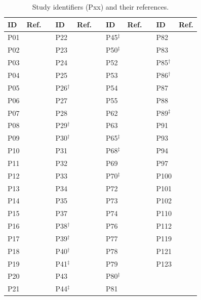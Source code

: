 \documentclass{ieeeaccess}
\begin{document}
\begin{table}[!t]
\caption{Study identifiers (Pxx) and their references.}
\label{tab:pids}
\centering
\footnotesize
\begin{tabular}{@{}llp{6mm}llp{6mm}llp{6mm}ll@{}}
\toprule
\textbf{ID} & \textbf{Ref.} & & \textbf{ID} & \textbf{Ref.} & &
\textbf{ID} & \textbf{Ref.} & & \textbf{ID} & \textbf{Ref.} \\
\midrule
P01 & \cite{P01} & & P22 & \cite{P22} & & P45$^{\ddagger}$ & \cite{P45} & & P82 & \cite{P82} \\
P02 & \cite{P02} & & P23 & \cite{P23} & & P50$^{\ddagger}$ & \cite{P50} & & P83 & \cite{P83} \\
P03 & \cite{P03} & & P24 & \cite{P24} & & P52 & \cite{P52} & & P85$^{\dagger}$ & \cite{P85} \\
P04 & \cite{P04} & & P25 & \cite{P25} & & P53 & \cite{P53} & & P86$^{\dagger}$ & \cite{P86} \\
P05 & \cite{P05} & & P26$^{\dagger}$ & \cite{P26} & & P54 & \cite{P54} & & P87 & \cite{P87} \\
P06 & \cite{P06} & & P27 & \cite{P27} & & P55 & \cite{P55} & & P88 & \cite{P88} \\
P07 & \cite{P07} & & P28 & \cite{P28} & & P62 & \cite{P62} & & P89$^{\ddagger}$ & \cite{P89} \\
P08 & \cite{P08} & & P29$^{\dagger}$ & \cite{P29} & & P63 & \cite{P63} & & P91 & \cite{P91} \\
P09 & \cite{P09} & & P30$^{\dagger}$ & \cite{P30} & & P65$^{\ddagger}$ & \cite{P65} & & P93 & \cite{P93} \\
P10 & \cite{P10} & & P31 & \cite{P31} & & P68$^{\ddagger}$ & \cite{P68} & & P94 & \cite{P94} \\
P11 & \cite{P11} & & P32 & \cite{P32} & & P69 & \cite{P69} & & P97 & \cite{P97} \\
P12 & \cite{P12} & & P33 & \cite{P33} & & P70$^{\ddagger}$ & \cite{P70} & & P100 & \cite{P100} \\
P13 & \cite{P13} & & P34 & \cite{P34} & & P72 & \cite{P72} & & P101 & \cite{P101} \\
P14 & \cite{P14} & & P35 & \cite{P35} & & P73 & \cite{P73} & & P102 & \cite{P102} \\
P15 & \cite{P15} & & P37 & \cite{P37} & & P74 & \cite{P74} & & P110 & \cite{P110} \\
P16 & \cite{P16} & & P38$^{\dagger}$ & \cite{P38} & & P76 & \cite{P76} & & P112 & \cite{P112} \\
P17 & \cite{P17} & & P39$^{\dagger}$ & \cite{P39} & & P77 & \cite{P77} & & P119 & \cite{P119} \\
P18 & \cite{P18} & & P40$^{\dagger}$ & \cite{P40} & & P78 & \cite{P78} & & P121 & \cite{P121} \\
P19 & \cite{P19} & & P41$^{\ddagger}$ & \cite{P41} & & P79 & \cite{P79} & & P123 & \cite{P123} \\
P20 & \cite{P20} & & P43 & \cite{P43} & & P80$^{\ddagger}$ & \cite{P80} & & & \\
P21 & \cite{P21} & & P44$^{\ddagger}$ & \cite{P44} & & P81 & \cite{P81} & & & \\
\bottomrule
\end{tabular}
\end{table}
\end{document}

